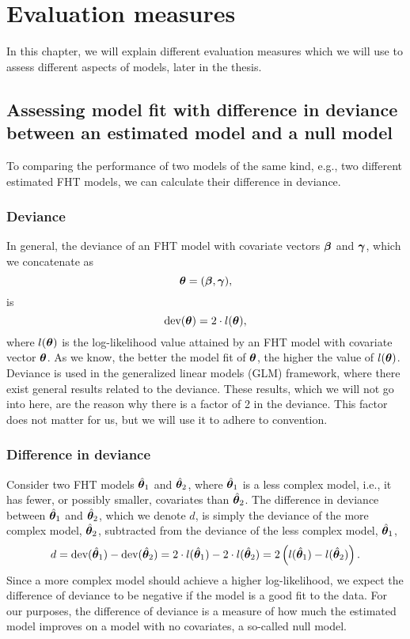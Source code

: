 \chapter{Evaluation measures}
In this chapter, we will explain different evaluation measures which we will use to assess different aspects of models, later in the thesis.

\section{Assessing model fit with difference in deviance between an estimated model and a null model}
To comparing the performance of two models of the same kind, e.g., two different estimated FHT models, we can calculate their difference in deviance.

\subsection{Deviance}
In general, the deviance of an FHT model with covariate vectors $\boldsymbol{\beta}$ and $\boldsymbol{\gamma}$, which we concatenate as
\begin{equation*}
    \boldsymbol{\theta}=(\boldsymbol{\beta},\boldsymbol{\gamma}),
\end{equation*}
is
\begin{equation*}
    \text{dev}(\boldsymbol{\theta})=2\cdot l(\boldsymbol{\theta}),
\end{equation*}
where $l(\boldsymbol{\theta})$ is the log-likelihood value attained by an FHT model with covariate vector $\boldsymbol{\theta}$.
As we know, the better the model fit of $\boldsymbol{\theta}$, the higher the value of $l(\boldsymbol{\theta})$.
Deviance is used in the generalized linear models (GLM) framework, where there exist general results related to the deviance.
These results, which we will not go into here, are the reason why there is a factor of 2 in the deviance.
This factor does not matter for us, but we will use it to adhere to convention.

\subsection{Difference in deviance}
Consider two FHT models $\hat{\boldsymbol{\theta}}_1$ and $\hat{\boldsymbol{\theta}}_2$, where $\hat{\boldsymbol{\theta}}_1$ is a less complex model, i.e., it has fewer, or possibly smaller, covariates than $\hat{\boldsymbol{\theta}}_2$.
The difference in deviance between $\hat{\boldsymbol{\theta}}_1$ and $\hat{\boldsymbol{\theta}}_2$, which we denote $d$, is simply the deviance of the more complex model, $\hat{\boldsymbol{\theta}}_2$, subtracted from the deviance of the less complex model, $\hat{\boldsymbol{\theta}}_1$,
\begin{equation*}
    d=\text{dev}(\hat{\boldsymbol{\theta}}_1)-\text{dev}(\hat{\boldsymbol{\theta}}_2)=2\cdot l(\hat{\boldsymbol{\theta}}_1)-2\cdot l(\hat{\boldsymbol{\theta}}_2)=2\left(l(\hat{\boldsymbol{\theta}}_1)-l(\hat{\boldsymbol{\theta}}_2)\right).
\end{equation*}
Since a more complex model should achieve a higher log-likelihood, we expect the difference of deviance to be negative if the model is a good fit to the data.
For our purposes, the difference of deviance is a measure of how much the estimated model improves on a model with no covariates, a so-called null model.

